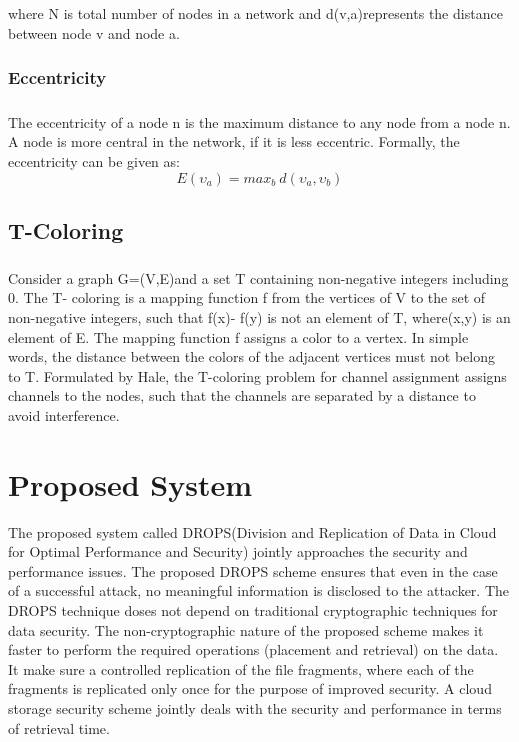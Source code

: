 \paragraph{}
where N is total number of nodes in a network and d(v,a)represents the distance between
node v and node a.
\subsection{Eccentricity}
\paragraph{}
The eccentricity of a node n is the maximum distance to any node from a node n. A
node is more central in the network, if it is less eccentric. Formally, the eccentricity can be
given as:
$$ E(\upsilon_{a}) = max _{b} \ d(\upsilon_{a},\upsilon_{b}) $$
\section{T-Coloring}
\paragraph{}
Consider a graph G=(V,E)and a set T containing non-negative integers including 0.
The T- coloring is a mapping function f from the vertices of V to the set of non-negative
integers, such that f(x)- f(y) is not an element of T, where(x,y) is an element of E. The
mapping function f assigns a color to a vertex. In simple words, the distance between the
colors of the adjacent vertices must not belong to T. Formulated by Hale, the T-coloring
problem for channel assignment assigns channels to the nodes, such that the channels are
separated by a distance to avoid interference.

\chapter{Proposed System}
The proposed system called DROPS(Division and Replication of Data in Cloud for Optimal Performance and Security) jointly approaches the security and performance issues. The proposed DROPS scheme ensures that even in the case of a successful attack, no meaningful information is disclosed to the attacker. The DROPS technique doses not depend on traditional cryptographic techniques for data security. The non-cryptographic nature of the proposed scheme makes it faster to perform the required operations (placement and retrieval) on the data. It make sure a controlled replication of the file fragments,
where each of the fragments is replicated only once for the purpose of improved security.
A cloud storage security scheme jointly deals with the security and performance in terms
of retrieval time.
